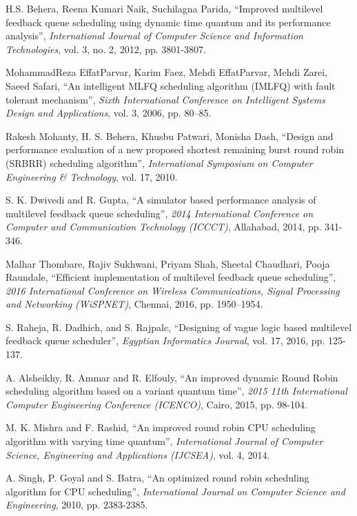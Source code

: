\documentclass[conference]{IEEEtran}
\begin{document}
\begin{thebibliography}{00}

 H.S. Behera, Reena Kumari Naik, Suchilagna Parida, ``Improved multilevel feedback queue scheduling using dynamic time quantum and its performance analysis'', \textit{International Journal of Computer Science and Information Technologies}, vol. 3, no. 2, 2012, pp. 3801-3807.

 MohammadReza EffatParvar, Karim Faez, Mehdi EffatParvar, Mehdi Zarei, Saeed Safari, ``An intelligent MLFQ scheduling algorithm (IMLFQ) with fault tolerant mechanism'', \textit{Sixth International Conference on Intelligent Systems Design and Applications}, vol. 3, 2006, pp. 80–85.

 Rakesh Mohanty, H. S. Behera, Khusbu Patwari, Monisha Dash, ``Design and performance evaluation of a new proposed shortest remaining burst round robin (SRBRR) scheduling algorithm'', \textit{International Symposium on Computer Engineering \& Technology}, vol. 17, 2010.

 S. K. Dwivedi and R. Gupta, ``A simulator based performance analysis of multilevel feedback queue scheduling'', \textit{2014 International Conference on Computer and Communication Technology (ICCCT)}, Allahabad, 2014, pp. 341-346.

 Malhar Thombare, Rajiv Sukhwani, Priyam Shah, Sheetal Chaudhari, Pooja Raundale, ``Efficient implementation of multilevel feedback queue scheduling'', \textit{2016 International Conference on Wireless Communications, Signal Processing and Networking (WiSPNET)}, Chennai, 2016, pp. 1950–1954.

 S. Raheja, R. Dadhich, and S. Rajpalc, ``Designing of vague logic based multilevel feedback queue scheduler'', \textit{Egyptian Informatics Journal}, vol. 17, 2016, pp. 125-137.

 A. Alsheikhy, R. Ammar and R. Elfouly, ``An improved dynamic Round Robin scheduling algorithm based on a variant quantum time'', \textit{2015 11th International Computer Engineering Conference (ICENCO)}, Cairo, 2015, pp. 98-104.

 M. K. Mishra and F. Rashid, ``An improved round robin CPU scheduling algorithm with varying time quantum'', \textit{International Journal of Computer Science, Engineering and Applications  (IJCSEA)}, vol. 4, 2014.

 A. Singh, P. Goyal and S. Batra, ``An optimized round robin scheduling algorithm for CPU scheduling'', \textit{International Journal on Computer Science and Engineering}, 2010, pp. 2383-2385.


\end{thebibliography}
\end{document}
